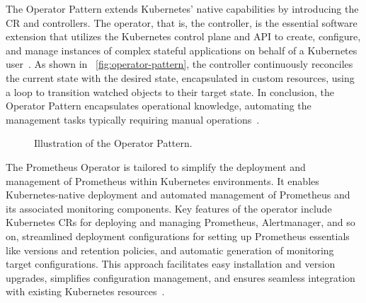 The Operator Pattern extends Kubernetes' native capabilities by introducing the \ac{CR} and controllers. The operator, that is, the controller, is the essential software extension that utilizes the Kubernetes control plane and API to create, configure, and manage instances of complex stateful applications on behalf of a Kubernetes user~\parencite{dobiesKubernetesOperators}. As shown in ~\autoref{fig:operator-pattern}, the controller continuously reconciles the current state with the desired state, encapsulated in custom resources, using a loop to transition watched objects to their target state. In conclusion, the Operator Pattern encapsulates operational knowledge, automating the management tasks typically requiring manual operations~\parencite{cncfCNCFOperatorWhite}. 

\begin{figure}[htpb]
    \centering
    \caption[Operator Pattern]{Illustration of the Operator Pattern.}\label{fig:operator-pattern}
\end{figure}

The Prometheus Operator is tailored to simplify the deployment and management of Prometheus within Kubernetes environments. It enables Kubernetes-native deployment and automated management of Prometheus and its associated monitoring components. Key features of the operator include Kubernetes \ac{CR}s for deploying and managing Prometheus, Alertmanager, and so on, streamlined deployment configurations for setting up Prometheus essentials like versions and retention policies, and automatic generation of monitoring target configurations. This approach facilitates easy installation and version upgrades, simplifies configuration management, and ensures seamless integration with existing Kubernetes resources~\parencite{prometheusoperatorIntroduction2020}. 

